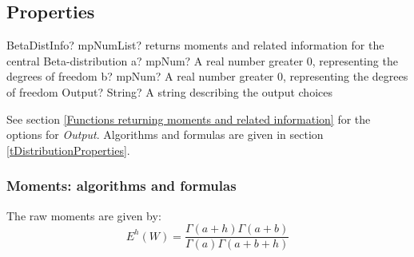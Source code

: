 %
%
%


\subsection{Properties}
\label{BetaDistributionProperties}


\begin{mpFunctionsExtract}
	\mpFunctionThree
	{BetaDistInfo? mpNumList? returns moments and related information for the central Beta-distribution}
	{a? mpNum? A real number greater 0, representing the degrees of freedom}
	{b? mpNum? A real number greater 0, representing the degrees of freedom}
	{Output? String? A string describing the output choices}
\end{mpFunctionsExtract}

\vspace{0.3cm}

See section \ref{Functions returning moments and related information} for the options for {\itshape\sffamily Output}. Algorithms and formulas are given in section \ref{tDistributionProperties}.



\subsubsection{Moments: algorithms and formulas}
The raw moments are given by:
\begin{equation}
	E^h(W) = \frac{\Gamma(a+h)\Gamma(a+b)}{\Gamma(a)\Gamma(a+b+h)}
\end{equation}

